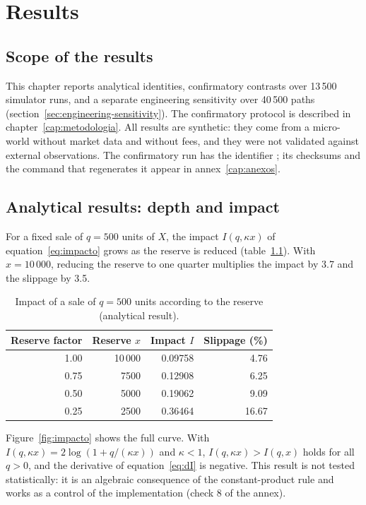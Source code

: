 \chapter{Results}
\label{cap:resultados}

\section{Scope of the results}

This chapter reports analytical identities, confirmatory contrasts over 13\,500 simulator runs, and a separate engineering sensitivity over 40\,500 paths (section~\ref{sec:engineering-sensitivity}). The confirmatory protocol is described in chapter~\ref{cap:metodologia}. All results are synthetic: they come from a micro-world without market data and without fees, and they were not validated against external observations. The confirmatory run has the identifier \code{\RunID}; its checksums and the command that regenerates it appear in annex~\ref{cap:anexos}.

\section{Analytical results: depth and impact}
\label{sec:res-analitico}

For a fixed sale of $q=500$ units of $X$, the impact $I(q,\kappa x)$ of equation~\eqref{eq:impacto} grows as the reserve is reduced (table~\ref{tab:impacto}). With $x=10\,000$, reducing the reserve to one quarter multiplies the impact by 3.7 and the slippage by 3.5.

\begin{table}[htbp]
\centering
\caption{Impact of a sale of $q=500$ units according to the reserve (analytical result).}
\label{tab:impacto}
\small
\begin{tabular}{@{}rrrr@{}}
\toprule
Reserve factor & Reserve $x$ & Impact $I$ & Slippage (\%) \\
\midrule
1.00 & 10\,000 & 0.09758 & 4.76 \\
0.75 & 7500 & 0.12908 & 6.25 \\
0.50 & 5000 & 0.19062 & 9.09 \\
0.25 & 2500 & 0.36464 & 16.67 \\
\bottomrule
\end{tabular}
\end{table}

Figure~\ref{fig:impacto} shows the full curve. With $I(q,\kappa x)=2\log(1+q/(\kappa x))$ and $\kappa<1$, $I(q,\kappa x)>I(q,x)$ holds for all $q>0$, and the derivative of equation~\eqref{eq:dI} is negative. This result is not tested statistically: it is an algebraic consequence of the constant-product rule and works as a control of the implementation (check 8 of the annex).

